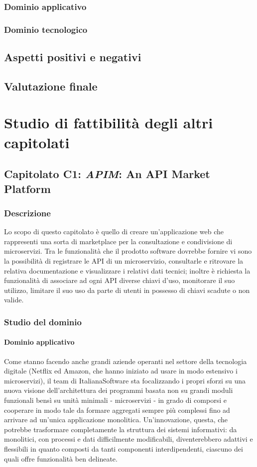 		\subsubsection{Dominio applicativo}
		\subsubsection{Dominio tecnologico}
	\subsection{Aspetti positivi e negativi}
	\subsection{Valutazione finale}
\newpage

\section{Studio di fattibilità degli altri capitolati}
	\subsection{Capitolato C1: \emph{APIM}: An API Market Platform}
		\subsubsection{Descrizione}
		Lo scopo di questo capitolato è quello di creare un'applicazione web che rappresenti una sorta di marketplace per la consultazione e 
		condivisione di microservizi. Tra le funzionalità che il prodotto software dovrebbe fornire vi sono la possibilità di registrare le API 
		di un microservizio, consultarle e ritrovare la relativa documentazione e visualizzare i relativi dati tecnici; inoltre è richiesta la 
		funzionalità di associare ad ogni API diverse chiavi d'uso, monitorare il suo utilizzo, limitare il suo uso da parte di utenti in possesso 
		di chiavi scadute o non valide.
		\subsubsection{Studio del dominio}
			\paragraph{Dominio applicativo}
			Come stanno facendo anche grandi aziende operanti nel settore della tecnologia digitale (Netflix ed Amazon, che hanno iniziato ad usare 
			in modo estensivo i microservizi), il team di ItalianaSoftware sta focalizzando i propri sforzi su una nuova visione dell'architettura 
			dei programmi basata non su grandi moduli funzionali bensì su unità minimali - microservizi - in grado di comporsi e cooperare in modo 
			tale da formare aggregati sempre più complessi fino ad arrivare ad un'unica applicazione monolitica. Un'innovazione, questa, che potrebbe 
			trasformare completamente la struttura dei sistemi informativi: da monolitici, con processi e dati difficilmente modificabili, diventerebbero 
			adattivi e flessibili in quanto composti da tanti componenti interdipendenti, ciascuno dei quali offre funzionalità ben delineate.
